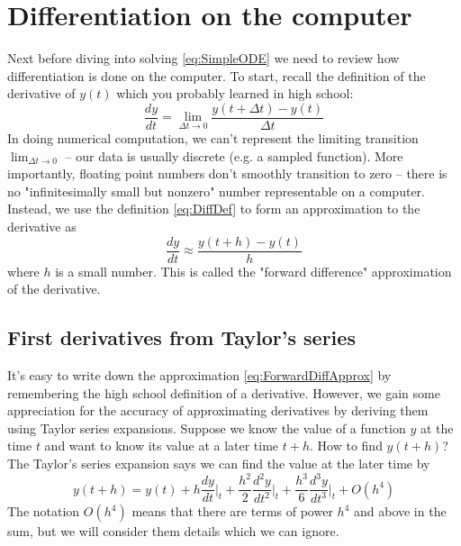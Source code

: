\documentclass[hidelinks,notitlepage]{book}
\begin{document}
\section{Differentiation on the computer}
Next before diving into solving \cref{eq:SimpleODE} we need to review how differentiation is done on the computer.  To start, recall the definition of the derivative of $y(t)$ which you probably learned in high school:
\begin{equation}
\label{eq:DiffDef}
\frac{d y}{d t} = 
\lim_{{\Delta t}\to 0} 
\frac{y(t + \Delta t) - y(t)}{\Delta t}
\end{equation}
In doing numerical computation, we can't represent the limiting transition $\lim_{{\Delta t}\to 0}$ -- our data is usually discrete (e.g. a sampled function).  More importantly, floating point numbers don't smoothly transition to zero -- there is no "infinitesimally small but nonzero" number representable on a computer.  Instead, we use the definition \cref{eq:DiffDef} to form an approximation to the derivative as
\begin{equation}
\label{eq:ForwardDiffApprox}
\frac{d y}{d t} \approx
\frac{y(t + h) - y(t)}{h}
\end{equation}
where $h$ is a small number.  This is called the "forward difference" approximation of the derivative.

\subsection{First derivatives from Taylor's series}
\label{sect:ForwardDiff}
It's easy to write down the approximation \cref{eq:ForwardDiffApprox} by remembering the high school definition of a derivative.  However, we gain some appreciation for the accuracy of approximating derivatives by deriving them using Taylor series expansions.  Suppose we know the value of a function $y$ at the time $t$ and want to know its value at a later time $t+h$. How to find $y(t+h)$?  The Taylor's series expansion says we can find the value at the later time by
\begin{equation}
\label{eq:ForwardTaylorsExpansion}
y(t+h) = y(t) 
+ h \frac{d y}{d t} \biggr\rvert_{t}
+ \frac{h^2}{2} \frac{d^2 y}{d t^2} \biggr\rvert_{t}
+ \frac{h^3}{6} \frac{d^3 y}{d t^3} \biggr\rvert_{t}
+ O(h^4)
\end{equation}
The notation $O(h^4)$ means that there are terms of power $h^4$ and above in the sum, but we will consider them details which we can ignore.  
\end{document}
